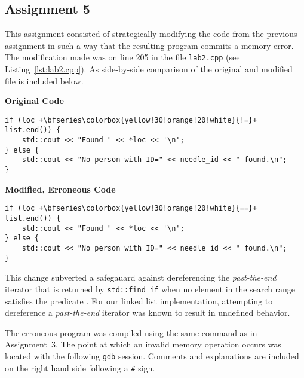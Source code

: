\documentclass[11pt, letterpaper]{article} %
\begin{document}
\subsection*{Assignment 5}

This assignment consisted of strategically modifying the code from the previous assignment in such a way that the resulting program commits a memory error. The modification made was on line 205 in the file \texttt{lab2.cpp} (see Listing~\ref{lst:lab2.cpp}). As side-by-side comparison of the original and modified file is included below.

\begin{minipage}{\linewidth-6mm}
\begin{multicols}{2}
\begin{center}\bfseries Original Code\end{center}
\begin{lstlisting}[style=labreportstyle-c++,escapechar=+,firstnumber=205]
if (loc +\bfseries\colorbox{yellow!30!orange!20!white}{!=}+ list.end()) {
    std::cout << "Found " << *loc << '\n';
} else {
    std::cout << "No person with ID=" << needle_id << " found.\n";
}
\end{lstlisting}

\columnbreak
\begin{center}\bfseries  Modified, Erroneous Code\end{center}
\begin{lstlisting}[style=labreportstyle-c++,escapechar=+,numbers=none]
if (loc +\bfseries\colorbox{yellow!30!orange!20!white}{==}+ list.end()) {
    std::cout << "Found " << *loc << '\n';
} else {
    std::cout << "No person with ID=" << needle_id << " found.\n";
}
\end{lstlisting}
\end{multicols}
\end{minipage}

This change subverted a safegauard against dereferencing the \emph{past-the-end} iterator \cite[\S27.2.1c7]{open-std-N4659} that is returned by \texttt{std::find\_if} when no element in the search range satisfies the predicate \cite{cppreference-std-find-if}. For our linked list implementation, attempting to dereference a \emph{past-the-end} iterator was known to result in undefined behavior.

The erroneous program was compiled using the same command as in Assignment~3. The point at which an invalid memory operation occurs was located with the following \texttt{gdb} session. Comments and explanations are included on the right hand side following a \texttt{\#} sign.
\end{document}
